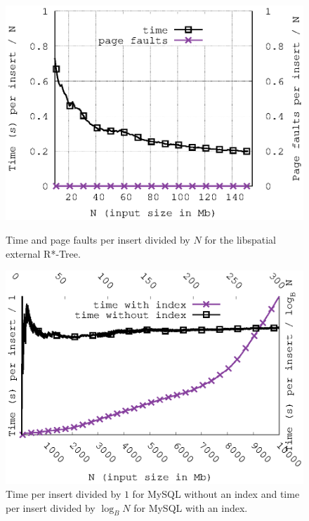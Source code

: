 \documentclass[twoside,11pt,openright]{report}
\begin{document}
\begin{figure}
\begin{minipage}{0.48\columnwidth}
  \centering
  \includegraphics[width=\linewidth]{../src/experiments/insert_experiment_results/2016-05-27.13_39_38/time_and_pfs}%
  \caption{Time and page faults per insert divided by $N$ for the libspatial external R*-Tree. \\}
  \label{fig:time_divided_with_asymptotic_libspatial}
\end{minipage}%
\hfill
\begin{minipage}{0.48\columnwidth}
  \centering
  \includegraphics[width=\linewidth]{../src/experiments/insert_experiment_results/combined_results/time_with_and_without_mysql}%
  \caption{Time per insert divided by $1$ for MySQL without an index and time per insert divided by $\log_B N$ for MySQL with an index.}
  \label{fig:time_divided_with_asymptotic_mysql}
\end{minipage}
\end{figure}
\end{document}
